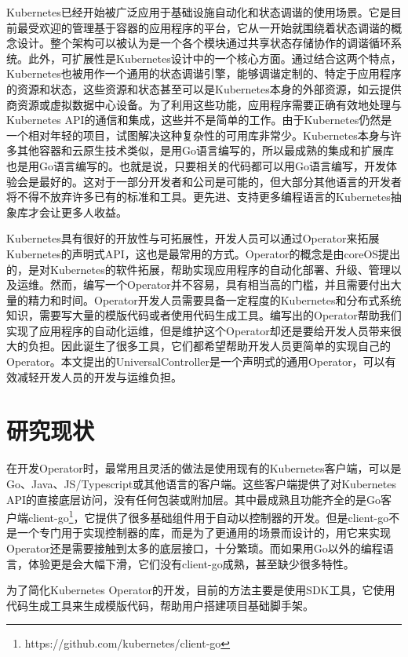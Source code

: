 \documentclass[macfonts,master]{njuthesis}
\begin{document}
Kubernetes已经开始被广泛应用于基础设施自动化和状态调谐的使用场景。它是目前最受欢迎的管理基于容器的应用程序的平台，它从一开始就围绕着状态调谐的概念设计。整个架构可以被认为是一个各个模块通过共享状态存储协作的调谐循环系统。此外，可扩展性是Kubernetes设计中的一个核心方面。通过结合这两个特点，Kubernetes也被用作一个通用的状态调谐引擎，能够调谐定制的、特定于应用程序的资源和状态，这些资源和状态甚至可以是Kubernetes本身的外部资源，如云提供商资源或虚拟数据中心设备。为了利用这些功能，应用程序需要正确有效地处理与Kubernetes API的通信和集成，这些并不是简单的工作。由于Kubernetes仍然是一个相对年轻的项目，试图解决这种复杂性的可用库非常少。Kubernetes本身与许多其他容器和云原生技术类似，是用Go语言编写的，所以最成熟的集成和扩展库也是用Go语言编写的。也就是说，只要相关的代码都可以用Go语言编写，开发体验会是最好的。这对于一部分开发者和公司是可能的，但大部分其他语言的开发者将不得不放弃许多已有的标准和工具。更先进、支持更多编程语言的Kubernetes抽象库才会让更多人收益。

Kubernetes具有很好的开放性与可拓展性，开发人员可以通过Operator来拓展Kubernetes的声明式API，这也是最常用的方式。Operator的概念是由coreOS提出的，是对Kubernetes的软件拓展，帮助实现应用程序的自动化部署、升级、管理以及运维\cite{operators}。然而，编写一个Operator并不容易，具有相当高的门槛，并且需要付出大量的精力和时间。Operator开发人员需要具备一定程度的Kubernetes和分布式系统知识，需要写大量的模版代码或者使用代码生成工具。编写出的Operator帮助我们实现了应用程序的自动化运维，但是维护这个Operator却还是要给开发人员带来很大的负担\cite{problemofoperators}。因此诞生了很多工具，它们都希望帮助开发人员更简单的实现自己的Operator。本文提出的UniversalController是一个声明式的通用Operator，可以有效减轻开发人员的开发与运维负担。

\section{研究现状}

在开发Operator时，最常用且灵活的做法是使用现有的Kubernetes客户端，可以是Go、Java、JS/Typescript或其他语言的客户端。这些客户端提供了对Kubernetes API的直接底层访问，没有任何包装或附加层。其中最成熟且功能齐全的是Go客户端client-go\footnote{https://github.com/kubernetes/client-go}，它提供了很多基础组件用于自动以控制器的开发。但是client-go不是一个专门用于实现控制器的库，而是为了更通用的场景而设计的，用它来实现Operator还是需要接触到太多的底层接口，十分繁琐。而如果用Go以外的编程语言，体验更是会大幅下滑，它们没有client-go成熟，甚至缺少很多特性。

为了简化Kubernetes Operator的开发，目前的方法主要是使用SDK工具，它使用代码生成工具来生成模版代码，帮助用户搭建项目基础脚手架。
\end{document}
